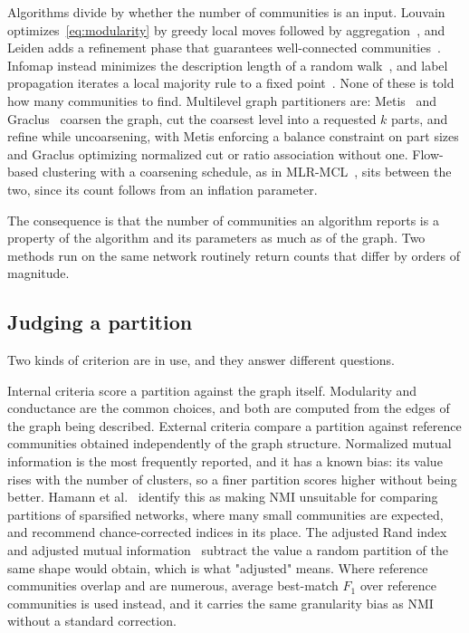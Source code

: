 Algorithms divide by whether the number of communities is an input. Louvain
optimizes~\eqref{eq:modularity} by greedy local moves followed by
aggregation~\cite{blondel2008fast}, and Leiden adds a refinement phase that
guarantees well-connected communities~\cite{traag2019louvain}. Infomap instead
minimizes the description length of a random walk~\cite{rosvall2008maps}, and
label propagation iterates a local majority rule to a fixed
point~\cite{raghavan2007near}. None of these is told how many communities to
find. Multilevel graph partitioners are: Metis~\cite{karypis1998metis} and
Graclus~\cite{dhillon2007weighted} coarsen the graph, cut the coarsest level into
a requested $k$ parts, and refine while uncoarsening, with Metis enforcing a
balance constraint on part sizes and Graclus optimizing normalized cut or ratio
association without one. Flow-based clustering with a coarsening schedule, as in
MLR-MCL~\cite{satuluri2009scalable}, sits between the two, since its count
follows from an inflation parameter.

The consequence is that the number of communities an algorithm reports is a
property of the algorithm and its parameters as much as of the graph. Two
methods run on the same network routinely return counts that differ by orders of
magnitude.

\subsection{Judging a partition}\label{sec:background:eval}

Two kinds of criterion are in use, and they answer different questions.

Internal criteria score a partition against the graph itself. Modularity and
conductance are the common choices, and both are computed from the edges of the
graph being described. External criteria compare a partition against reference
communities obtained independently of the graph structure. Normalized mutual
information is the most frequently reported, and it has a known bias: its value
rises with the number of clusters, so a finer partition scores higher without
being better. Hamann et al.~\cite{hamann2016structure} identify this as making
NMI unsuitable for comparing partitions of sparsified networks, where many small
communities are expected, and recommend chance-corrected indices in its place.
The adjusted Rand index and adjusted mutual
information~\cite{vinh2010information} subtract the value a random partition of
the same shape would obtain, which is what "adjusted" means. Where reference
communities overlap and are numerous, average best-match $F_1$ over reference
communities is used instead, and it carries the same granularity bias as NMI
without a standard correction.


